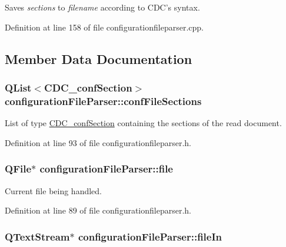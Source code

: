 Saves {\itshape sections} to {\itshape filename} according to C\+D\+C's syntax. 



Definition at line 158 of file configurationfileparser.\+cpp.



\subsection{Member Data Documentation}
\hypertarget{classconfiguration_file_parser_a87df99e40e77025aa5a3d9b9f79d7be9}{
\subsubsection[{conf\+File\+Sections}]{\setlength{\rightskip}{0pt plus 5cm}Q\+List$<${\bf C\+D\+C\+\_\+conf\+Section}$>$ configuration\+File\+Parser\+::conf\+File\+Sections\hspace{0.3cm}{\ttfamily [private]}}}\label{classconfiguration_file_parser_a87df99e40e77025aa5a3d9b9f79d7be9}


List of type \hyperlink{struct_c_d_c__conf_section}{C\+D\+C\+\_\+conf\+Section} containing the sections of the read document. 



Definition at line 93 of file configurationfileparser.\+h.

\hypertarget{classconfiguration_file_parser_a699c9d49daf1310225c672e070b93960}{
\subsubsection[{file}]{\setlength{\rightskip}{0pt plus 5cm}Q\+File$\ast$ configuration\+File\+Parser\+::file\hspace{0.3cm}{\ttfamily [private]}}}\label{classconfiguration_file_parser_a699c9d49daf1310225c672e070b93960}


Current file being handled. 



Definition at line 89 of file configurationfileparser.\+h.

\hypertarget{classconfiguration_file_parser_ad85b3428033be9a146b3f35a31b2f756}{
\subsubsection[{file\+In}]{\setlength{\rightskip}{0pt plus 5cm}Q\+Text\+Stream$\ast$ configuration\+File\+Parser\+::file\+In\hspace{0.3cm}{\ttfamily [private]}}}\label{classconfiguration_file_parser_ad85b3428033be9a146b3f35a31b2f756}


